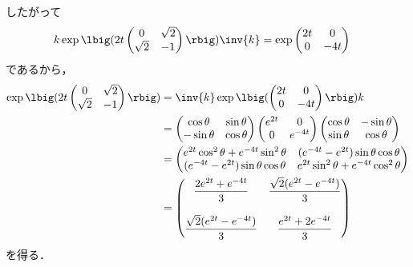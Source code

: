 \begin{npfwn}
  したがって
  \begin{align*}
    k\exp\lbig(2t\begin{pmatrix}
      0 & \sqrt{2} \\
      \sqrt{2} & -1 
    \end{pmatrix}\rbig)\inv{k} &= \exp
                                 \begin{pmatrix}
                                   2t & 0 \\ 0 & -4t
                                 \end{pmatrix}
  \end{align*}
  であるから，
  \begin{align*}
    \exp\lbig(2t\begin{pmatrix}
      0 & \sqrt{2} \\
      \sqrt{2} & -1 
    \end{pmatrix}\rbig) &= \inv{k} \exp\lbig(
                                 \begin{pmatrix}
                                   2t & 0 \\ 0 & -4t
                                 \end{pmatrix}\rbig)k\\
        &=
          \begin{pmatrix}
            \cos \theta  & \sin \theta \\ -\sin \theta & \cos \theta
          \end{pmatrix}
                                                         \begin{pmatrix}
                                                           e^{2t} & 0 \\ 0 & e^{-4t}
                                                         \end{pmatrix}
                                                                             \begin{pmatrix}
                                                                               \cos \theta  & -\sin \theta \\ \sin \theta & \cos \theta
                                                                             \end{pmatrix}\\
        &=
          \begin{pmatrix}
            e^{2t}\cos^2\theta + e^{-4t}\sin^2 \theta  & (e^{-4t} - e^{2t})\sin\theta \cos\theta \\ (e^{-4t} - e^{2t})\sin\theta \cos\theta  & e^{2t}\sin^2\theta +e^{-4t}\cos^2\theta
          \end{pmatrix}\\
        &= \begin{pmatrix}
          \dfrac{2e^{2t} + e^{-4t}}{3} &  \dfrac{\sqrt{2} (e^{2t} - e^{-4t})}{3}\\
          \\
          \dfrac{\sqrt{2} (e^{2t} - e^{-4t})}{3} & \dfrac{e^{2t} + 2e^{-4t}}{3}
                 \end{pmatrix}
  \end{align*}
  を得る．
\end{npfwn}

